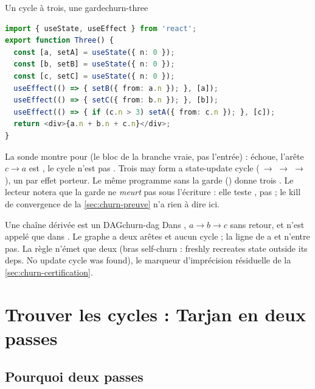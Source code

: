 \begin{exemple}{Un cycle à trois, une garde}{churn-three}
\begin{lstlisting}[language=TypeScript,caption={\file{/tmp/ch15/three.tsx}},label={lst:churn-three}]
import { useState, useEffect } from 'react';
export function Three() {
  const [a, setA] = useState({ n: 0 });
  const [b, setB] = useState({ n: 0 });
  const [c, setC] = useState({ n: 0 });
  useEffect(() => { setB({ from: a.n }); }, [a]);
  useEffect(() => { setC({ from: b.n }); }, [b]);
  useEffect(() => { if (c.n > 3) setA({ from: c.n }); }, [c]);
  return <div>{a.n + b.n + c.n}</div>;
}
\end{lstlisting}
La sonde montre  pour  (le bloc de la branche vraie, pas
l'entrée) :  échoue, l'arête $c \to a$ est , le cycle n'est
pas . Trois \Warning{} \og may form a state-update cycle
(~→ ~→ ~→ )\fg, un par effet porteur. Le même programme sans la garde
() donne trois \Error. Le lecteur notera que la garde 
ne \emph{meurt} pas sous l'écriture  : elle teste , pas
 ; le kill de convergence de la \cref{sec:churn-preuve} n'a rien à dire ici.
\end{exemple}

\begin{exemple}{Une chaîne dérivée est un DAG}{churn-dag}
Dans , $a \to b \to c$ sans retour, et  n'est appelé que dans
. Le graphe a deux arêtes  et aucun cycle ; la ligne de
 a  et n'entre pas. La règle n'émet que
deux \Info{} (bras self-churn : \og freshly recreates state  outside its deps.
No update cycle was found\fg), le marqueur d'imprécision résiduelle de la
\cref{sec:churn-certification}.
\end{exemple}

\section{Trouver les cycles : Tarjan en deux passes}
\label{sec:churn-tarjan}

\subsection{Pourquoi deux passes}

